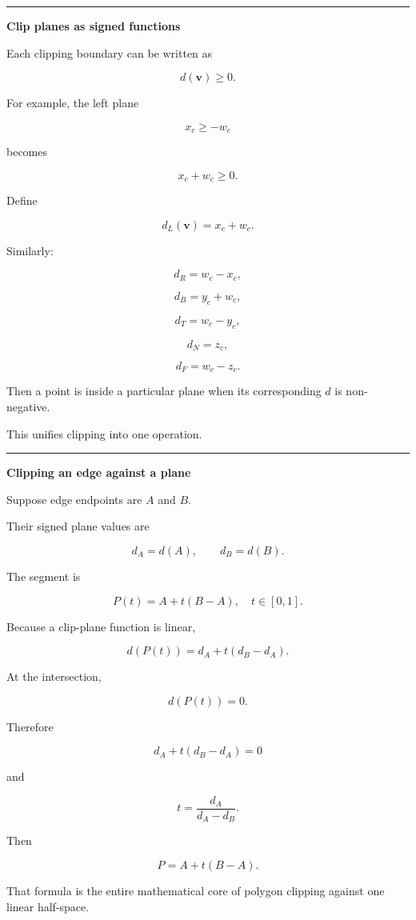 \begin{center}\rule{0.5\linewidth}{0.5pt}\end{center}

\textbf{Clip planes as signed functions}

Each clipping boundary can be written as

\[
d(\mathbf v)\ge0.
\]

For example, the left plane

\[
x_c\ge-w_c
\]

becomes

\[
x_c+w_c\ge0.
\]

Define

\[
d_L(\mathbf v)=x_c+w_c.
\]

Similarly:

\[
d_R=w_c-x_c,
\]

\[
d_B=y_c+w_c,
\]

\[
d_T=w_c-y_c,
\]

\[
d_N=z_c,
\]

\[
d_F=w_c-z_c.
\]

Then a point is inside a particular plane when its corresponding \(d\) is non-negative.

This unifies clipping into one operation.

\begin{center}\rule{0.5\linewidth}{0.5pt}\end{center}

\textbf{Clipping an edge against a plane}

Suppose edge endpoints are \(A\) and \(B\).

Their signed plane values are

\[
d_A=d(A),\qquad
d_B=d(B).
\]

The segment is

\[
P(t)=A+t(B-A),\quad t\in[0,1].
\]

Because a clip-plane function is linear,

\[
d(P(t))
=
d_A+t(d_B-d_A).
\]

At the intersection,

\[
d(P(t))=0.
\]

Therefore

\[
d_A+t(d_B-d_A)=0
\]

and

\[
\boxed{
t=
\frac{d_A}{d_A-d_B}
}.
\]

Then

\[
\boxed{
P=A+t(B-A)
}.
\]

That formula is the entire mathematical core of polygon clipping against one linear half-space.

